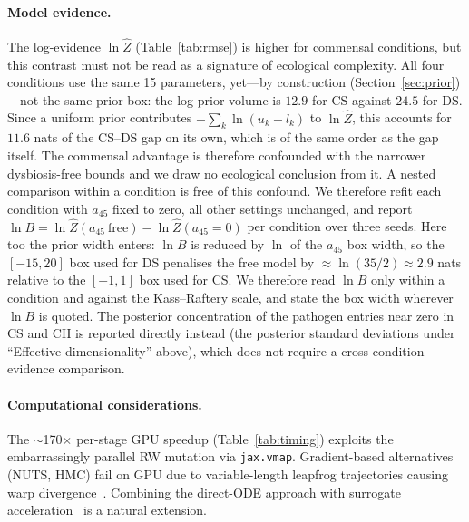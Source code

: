 \documentclass[11pt,a4paper]{article}
\begin{document}
\paragraph{Model evidence.}
The log-evidence $\ln\hat{Z}$ (Table~\ref{tab:rmse}) is higher for commensal conditions, but this contrast must not be read as a signature of ecological complexity.
All four conditions use the same 15 parameters, yet---by construction (Section~\ref{sec:prior})---not the same prior box: the log prior volume is $12.9$ for CS against $24.5$ for DS.
Since a uniform prior contributes $-\sum_k\ln(u_k-l_k)$ to $\ln\hat{Z}$, this accounts for $11.6$ nats of the CS--DS gap on its own, which is of the same order as the gap itself.
The commensal advantage is therefore confounded with the narrower dysbiosis-free bounds and we draw no ecological conclusion from it.
A nested comparison within a condition is free of this confound.
We therefore refit each condition with $a_{45}$ fixed to zero, all other settings unchanged, and report $\ln B = \ln\hat{Z}(a_{45}\ \text{free}) - \ln\hat{Z}(a_{45}=0)$ per condition over three seeds.
Here too the prior width enters: $\ln B$ is reduced by $\ln$ of the $a_{45}$ box width, so the $[-15,20]$ box used for DS penalises the free model by $\approx\ln(35/2)\approx2.9$ nats relative to the $[-1,1]$ box used for CS.
We therefore read $\ln B$ only within a condition and against the Kass--Raftery scale, and state the box width wherever $\ln B$ is quoted.
The posterior concentration of the pathogen entries near zero in CS and CH is reported directly instead (the posterior standard deviations under ``Effective dimensionality'' above), which does not require a cross-condition evidence comparison.

\paragraph{Computational considerations.}
The $\sim$170$\times$ per-stage GPU speedup (Table~\ref{tab:timing}) exploits the embarrassingly parallel RW mutation via \texttt{jax.vmap}.
Gradient-based alternatives (NUTS, HMC) fail on GPU due to variable-length leapfrog trajectories causing warp divergence~\cite{Dance2025FSM}.
Combining the direct-ODE approach with surrogate acceleration~\cite{Fritsch2025BayesianMicrofilms} is a natural extension.

\end{document}
